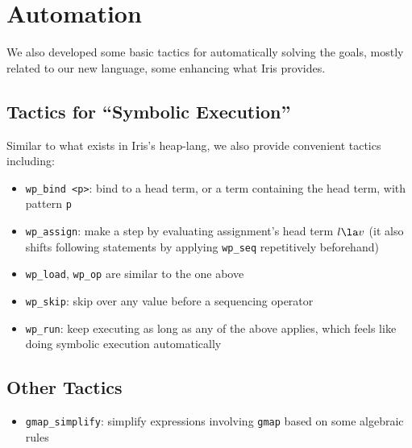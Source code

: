 \section{Automation}
\label{sec:auto}

We also developed some basic tactics for automatically solving the goals,
mostly related to our new language, some enhancing what Iris provides.

\subsection{Tactics for ``Symbolic Execution''}

Similar to what exists in Iris's heap-lang, we also provide convenient tactics
including:

\begin{itemize}
    \item \texttt{wp\_bind <p>}: bind to a head term, or a term containing the head term, with pattern \texttt{p}
    \item \texttt{wp\_assign}: make a step by evaluating assignment's head term $l \la v$
        (it also shifts following statements by applying \texttt{wp\_seq} repetitively beforehand)
    \item \texttt{wp\_load}, \texttt{wp\_op} are similar to the one above
    \item \texttt{wp\_skip}: skip over any value before a sequencing operator
    \item \texttt{wp\_run}: keep executing as long as any of the above applies, which feels like doing
        symbolic execution automatically
\end{itemize}

\subsection{Other Tactics}

\begin{itemize}
    \item \texttt{gmap\_simplify}: simplify expressions involving \texttt{gmap} based on some algebraic rules
\end{itemize}
